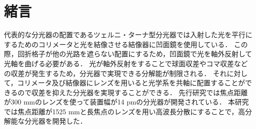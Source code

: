 \chapter{緒言}

代表的な分光器の配置であるツェルニ・ターナ型分光器では入射した光を平行にするためのコリメータと光を結像させる結像器に凹面鏡を使用している．
この際，回折格子が他の光路を遮らない配置にするため，凹面鏡で光を軸外反射して光軸を曲げる必要がある．
光が軸外反射をすることで球面収差やコマ収差などの収差が発生するため，分光器で実現できる分解能が制限される．
それに対して，コリメータ及び結像器にレンズを用いると光学系を共軸に配置することができるので収差を抑えた分光器を実現することができる．
先行研究では焦点距離が300 mmのレンズを使って装置幅が14 pmの分光器が開発されている\cite{senkou}．
本研究では焦点距離が1525 mmと長焦点のレンズを用い高波長分散にすることで，高分解能な分光器を開発した．






